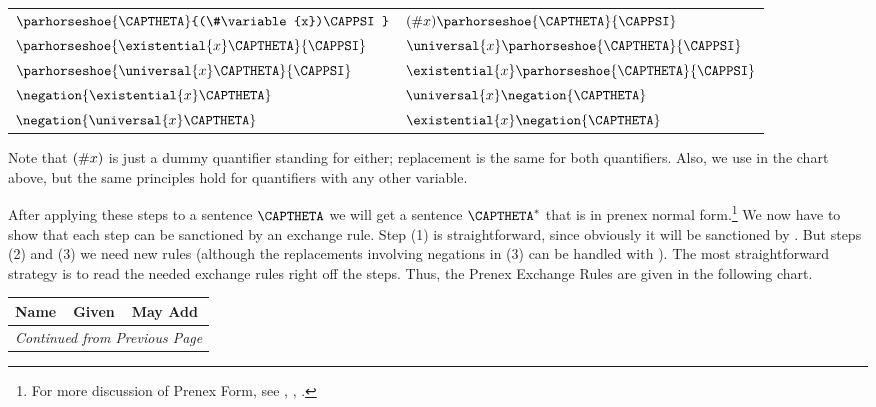 \begin{PROOF}
\begin{cenumerate}
\begin{longtable}[c]{ l l }
$\parhorseshoe{\CAPTHETA}{(\#\variable{x})\CAPPSI}$ & $(\#\variable{x})\parhorseshoe{\CAPTHETA}{\CAPPSI}$ \\

$\parhorseshoe{\existential{\variable{x}}\CAPTHETA}{\CAPPSI}$ & $\universal{\variable{x}}\parhorseshoe{\CAPTHETA}{\CAPPSI}$ \\
$\parhorseshoe{\universal{\variable{x}}\CAPTHETA}{\CAPPSI}$ & $\existential{\variable{x}}\parhorseshoe{\CAPTHETA}{\CAPPSI}$ \\

$\negation{\existential{\variable{x}}\CAPTHETA}$ & $\universal{\variable{x}}\negation{\CAPTHETA}$ \\
$\negation{\universal{\variable{x}}\CAPTHETA}$ & $\existential{\variable{x}}\negation{\CAPTHETA}$ \\
\bottomrule
\end{longtable}
Note that $(\#x)$ is just a dummy quantifier standing for either; 
replacement is the same for both quantifiers.  Also, we use  in the chart above, but the same principles hold for quantifiers with any other variable.
\end{cenumerate}
After applying these steps to a sentence $\CAPTHETA$ we will get a sentence $\CAPTHETA^*$ that is in prenex normal form.\footnote{For more discussion of Prenex Form, see \citealt[132]{Kleene1967}, \citealt[54]{Hodges2001}, \citeyear[30]{Hodges2001b}.} 
We now have to show that each step can be sanctioned by an exchange rule.
Step (1) is straightforward, since obviously it will be sanctioned by .
But steps (2) and (3) we need new rules (although the replacements involving negations in (3) can be handled with ).
The most straightforward strategy is to read the needed exchange rules right off the steps. 
Thus, the Prenex Exchange Rules are given in the following chart.
\renewcommand{\arraystretch}{1.5}
\begin{longtable}[c]{ p{1in} l l } %
\toprule
\textbf{Name} & \textbf{Given} & \textbf{May Add} \\ 
\midrule
\endfirsthead
\multicolumn{3}{c}{\emph{Continued from Previous Page}}\\

\end{longtable}
\end{PROOF}
